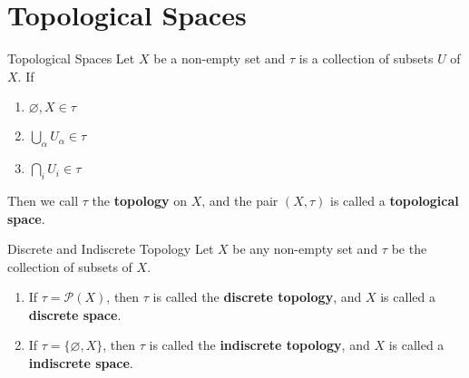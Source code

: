 \section{Topological Spaces}

\begin{definition}{Topological Spaces}{}
  Let $X$ be a non-empty set and $\tau$ is a collection of subsets
  $U$ of $X$. If

  \begin{enumerate}

    \item $\varnothing, X \in \tau$
    \item $\bigcup_{\alpha} U_{\alpha} \in \tau$
    \item $\bigcap_{i} U_{i} \in \tau$

  \end{enumerate}

  Then we call $\tau$ the \textbf{topology} on $X$, and the pair
  $(X,\tau)$ is called a \textbf{topological space}.
\end{definition}

\begin{definition}{Discrete and Indiscrete Topology}{}
  Let $X$ be any non-empty set and $\tau$ be the collection of subsets of $X$.
  \begin{enumerate}

    \item If $\tau = \mathcal{P}(X)$, then $\tau$ is called the
      \textbf{discrete topology}, and $X$ is called a
      \textbf{discrete space}.
    \item If $\tau = \{\varnothing, X\}$, then $\tau$ is called the
      \textbf{indiscrete topology}, and $X$ is called a
      \textbf{indiscrete space}.

  \end{enumerate}
\end{definition}
